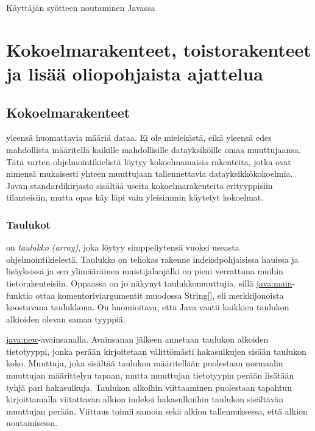 \documentclass{tufte-book}
\newcommand{\eng}[1]{\textit{(#1)}}
\newcommand{\new}[1]{\textit{\gls{#1}}}
\newcommand{\neweng}[2]{\new{#1} \eng{#2}}
\newcommand{\java}[1]{\underline{\gls{java:#1}}}
\newcommand{\code}[3]{
\begin{listing}
    \inputminted{java}{OhjelmointiopasEsimerkit/src/#1/#2.java}
    \caption{#3}
    \label{Java-#1-#2}
\end{listing}
}
\begin{document}
\code{week2/basicexamples}{UserInput}{Käyttäjän syötteen noutaminen Javassa}


\chapter{Kokoelmarakenteet, toistorakenteet ja lisää oliopohjaista ajattelua}
\label{perusteet2}


\section{Kokoelmarakenteet}
\label{kokoelmista}

 yleensä huomattavia määriä dataa. Ei ole mielekästä, eikä
yleensä edes mahdollista määritellä kaikille mahdollisille datayksiköille omaa muuttujaansa.
Tätä varten ohjelmointikielistä löytyy kokoelmamaisia rakenteita, jotka ovat nimensä mukaisesti
yhteen muuttujaan tallennettavia datayksikkökokoelmia. Javan standardikirjasto sisältää useita
kokoelmarakenteita erityyppisiin tilanteisiin, mutta opas käy läpi vain yleisimmin käytetyt
kokoelmat.

\subsection{Taulukot}
\label{taulukot}

 on \neweng{taulukko}{array}, joka löytyy
simppeliytensä vuoksi useasta ohjelmointikielestä. Taulukko on tehokas rakenne indeksipohjaisissa
hauissa ja lisäyksissä ja sen ylimääräinen muistijalanjälki on pieni verrattuna muihin
tietorakenteisiin. Oppaassa on jo näkynyt taulukkomuuttujia, sillä \java{main}-funktio ottaa
komentoriviargumentit muodossa String[], eli merkkijonoista koostuvana taulukkona. On huomioitava,
että Java vaatii kaikkien taulukon alkioiden olevan samaa tyyppiä.

 \java{new}-avainsanalla. Avainsanan jälkeen annetaan taulukon
alkoiden tietotyyppi, jonka perään kirjoitetaan välittömästi hakasulkujen sisään taulukon koko.
Muuttuja, joka sisältää taulukon määritellään puolestaan normaalin muuttujan määrittelyn tapaan,
mutta muuttujan tietotyypin perään lisätään tyhjä pari hakasulkuja. Taulukon alkoihin viittaaminen
puolestaan tapahtuu kirjoittamalla viitattavan alkion indeksi hakasulkuihin taulukon sisältävän
muuttujan perään. Viittaus toimii samoin sekä alkion tallennuksessa, että alkion noutamisessa.
\end{document}
